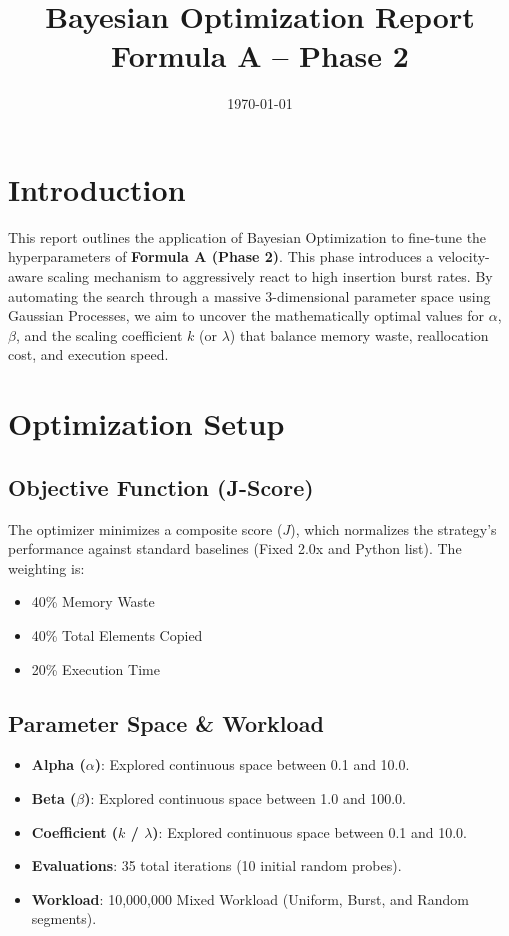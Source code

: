 \documentclass[11pt, a4paper]{article}
\title{Bayesian Optimization Report \\ \Large Formula A -- Phase 2}
\author{}
\date{\today}
\begin{document}
\maketitle
\tableofcontents
\listoffigures
\listoftables
\newpage

\section{Introduction}
This report outlines the application of Bayesian Optimization to fine-tune the hyperparameters of \textbf{Formula A (Phase 2)}. This phase introduces a velocity-aware scaling mechanism to aggressively react to high insertion burst rates. By automating the search through a massive 3-dimensional parameter space using Gaussian Processes, we aim to uncover the mathematically optimal values for $\alpha$, $\beta$, and the scaling coefficient $k$ (or $\lambda$) that balance memory waste, reallocation cost, and execution speed.

\section{Optimization Setup}

\subsection{Objective Function (J-Score)}
The optimizer minimizes a composite score ($J$), which normalizes the strategy's performance against standard baselines (Fixed 2.0x and Python list). The weighting is:
\begin{itemize}
    \item 40\% Memory Waste
    \item 40\% Total Elements Copied
    \item 20\% Execution Time
\end{itemize}

\subsection{Parameter Space \& Workload}
\begin{itemize}
    \item \textbf{Alpha ($\alpha$)}: Explored continuous space between 0.1 and 10.0.
    \item \textbf{Beta ($\beta$)}: Explored continuous space between 1.0 and 100.0.
    \item \textbf{Coefficient ($k$ / $\lambda$)}: Explored continuous space between 0.1 and 10.0.
    \item \textbf{Evaluations}: 35 total iterations (10 initial random probes).
    \item \textbf{Workload}: 10,000,000 Mixed Workload (Uniform, Burst, and Random segments).
\end{itemize}
\end{document}

